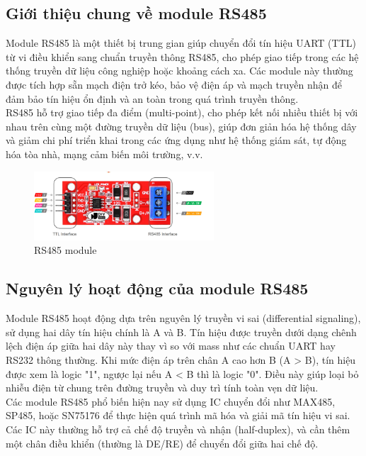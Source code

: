 \subsection{Giới thiệu chung về module RS485} 
\tab Module RS485 là một thiết bị trung gian giúp chuyển đổi tín hiệu UART (TTL) từ vi điều khiển sang chuẩn truyền thông RS485, cho phép giao tiếp trong các hệ thống truyền dữ liệu công nghiệp hoặc khoảng cách xa. Các module này thường được tích hợp sẵn mạch điện trở kéo, bảo vệ điện áp và mạch truyền nhận để đảm bảo tín hiệu ổn định và an toàn trong quá trình truyền thông.\\
\tab RS485 hỗ trợ giao tiếp đa điểm (multi-point), cho phép kết nối nhiều thiết bị với nhau trên cùng một đường truyền dữ liệu (bus), giúp đơn giản hóa hệ thống dây và giảm chi phí triển khai trong các ứng dụng như hệ thống giám sát, tự động hóa tòa nhà, mạng cảm biến môi trường, v.v.
\begin{figure}[H]
  \centering
  \includegraphics[width=0.6\textwidth]{Images/RS485.png}
  \caption{RS485 module}
\end{figure}
\subsection{Nguyên lý hoạt động của module RS485} 
\tab Module RS485 hoạt động dựa trên nguyên lý truyền vi sai (differential signaling), sử dụng hai dây tín hiệu chính là A và B. Tín hiệu được truyền dưới dạng chênh lệch điện áp giữa hai dây này thay vì so với mass như các chuẩn UART hay RS232 thông thường. Khi mức điện áp trên chân A cao hơn B (A > B), tín hiệu được xem là logic "1", ngược lại nếu A < B thì là logic "0". Điều này giúp loại bỏ nhiễu điện từ chung trên đường truyền và duy trì tính toàn vẹn dữ liệu.\\
\tab Các module RS485 phổ biến hiện nay sử dụng IC chuyển đổi như MAX485, SP485, hoặc SN75176 để thực hiện quá trình mã hóa và giải mã tín hiệu vi sai. Các IC này thường hỗ trợ cả chế độ truyền và nhận (half-duplex), và cần thêm một chân điều khiển (thường là DE/RE) để chuyển đổi giữa hai chế độ.

